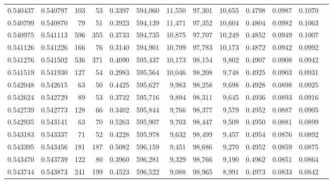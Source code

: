 \begin{tabular}{rrrrrrrrrrrrr}
0.540437 & 0.540797 &   103 &    53 &                                     0.3397 & 594,060 &  11,550 &  97,301 &  10,655 & 0.4798 & 0.0987 & 0.1070 \\
0.540799 & 0.540870 &    79 &    51 &                                     0.3923 & 594,139 &  11,471 &  97,352 &  10,604 & 0.4804 & 0.0982 & 0.1063 \\
0.540975 & 0.541113 &   596 &   355 &                                     0.3733 & 594,735 &  10,875 &  97,707 &  10,249 & 0.4852 & 0.0949 & 0.1007 \\
0.541126 & 0.541226 &   166 &    76 &                                     0.3140 & 594,901 &  10,709 &  97,783 &  10,173 & 0.4872 & 0.0942 & 0.0992 \\
0.541276 & 0.541502 &   536 &   371 &                                     0.4090 & 595,437 &  10,173 &  98,154 &   9,802 & 0.4907 & 0.0908 & 0.0942 \\
0.541519 & 0.541930 &   127 &    54 &                                     0.2983 & 595,564 &  10,046 &  98,208 &   9,748 & 0.4925 & 0.0903 & 0.0931 \\
0.542048 & 0.542615 &    63 &    50 &                                     0.4425 & 595,627 &   9,983 &  98,258 &   9,698 & 0.4928 & 0.0898 & 0.0925 \\
0.542624 & 0.542729 &    89 &    53 &                                     0.3732 & 595,716 &   9,894 &  98,311 &   9,645 & 0.4936 & 0.0893 & 0.0916 \\
0.542739 & 0.542773 &   128 &    66 &                                     0.3402 & 595,844 &   9,766 &  98,377 &   9,579 & 0.4952 & 0.0887 & 0.0905 \\
0.542935 & 0.543141 &    63 &    70 &                                     0.5263 & 595,907 &   9,703 &  98,447 &   9,509 & 0.4950 & 0.0881 & 0.0899 \\
0.543183 & 0.543337 &    71 &    52 &                                     0.4228 & 595,978 &   9,632 &  98,499 &   9,457 & 0.4954 & 0.0876 & 0.0892 \\
0.543395 & 0.543456 &   181 &   187 &                                     0.5082 & 596,159 &   9,451 &  98,686 &   9,270 & 0.4952 & 0.0859 & 0.0875 \\
0.543470 & 0.543739 &   122 &    80 &                                     0.3960 & 596,281 &   9,329 &  98,766 &   9,190 & 0.4962 & 0.0851 & 0.0864 \\
0.543744 & 0.543873 &   241 &   199 &                                     0.4523 & 596,522 &   9,088 &  98,965 &   8,991 & 0.4973 & 0.0833 & 0.0842 \\

\end{tabular}
